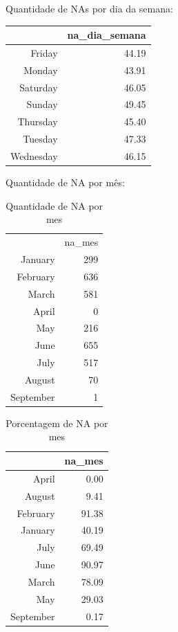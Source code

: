 \documentclass[12pt, reqno]{amsart}
\begin{document}
Quantidade de NAs por dia da semana:

\begin{table}[!ht]
\centering
\begin{tabular}{rr}
  \hline
 & na\_dia\_semana \\ 
  \hline
Friday & 44.19 \\ 
  Monday & 43.91 \\ 
  Saturday & 46.05 \\ 
  Sunday & 49.45 \\ 
  Thursday & 45.40 \\ 
  Tuesday & 47.33 \\ 
  Wednesday & 46.15 \\ 
   \hline
\end{tabular}
\end{table}


Quantidade de NA por mês:
\begin{table}[ht]
    \centering
    \begin{tabular}{rr}
 & na\_mes \\ 
        January & 299 \\ 
        February & 636 \\ 
        March & 581 \\ 
        April &   0 \\ 
        May & 216 \\ 
        June & 655 \\ 
        July & 517 \\ 
        August &  70 \\ 
        September &   1 \\ 
    \end{tabular}
    \caption{Quantidade de NA por mes}
\end{table}

\begin{table}[ht]
\centering
\begin{tabular}{rr}
  \hline
 & na\_mes \\ 
  \hline
April & 0.00 \\ 
  August & 9.41 \\ 
  February & 91.38 \\ 
  January & 40.19 \\ 
  July & 69.49 \\ 
  June & 90.97 \\ 
  March & 78.09 \\ 
  May & 29.03 \\ 
  September & 0.17 \\ 
   \hline
\end{tabular}
\caption{Porcentagem de NA por mes}
\end{table}
\end{document}
